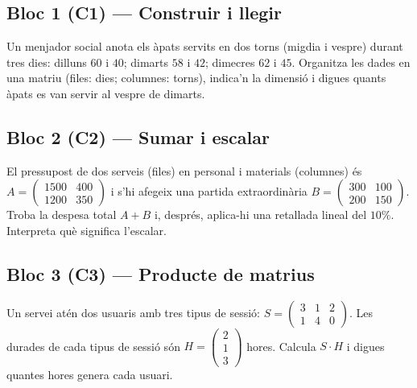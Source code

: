 \subsection{Bloc 1 (C1) — Construir i llegir}

\begin{exercicis}[Bloc 1]
\begin{exlist}
  \item Un menjador social anota els àpats servits en dos torns (migdia i vespre)
        durant tres dies: dilluns $60$ i $40$; dimarts $58$ i $42$; dimecres $62$ i
        $45$. Organitza les dades en una matriu (files: dies; columnes: torns),
        indica'n la dimensió i digues quants àpats es van servir al vespre de
        dimarts.
\end{exlist}
\end{exercicis}

\subsection{Bloc 2 (C2) — Sumar i escalar}

\begin{exercicis}[Bloc 2]
\begin{exlist}
  \item El pressupost de dos serveis (files) en personal i materials (columnes) és
        $A=\begin{pmatrix} 1500 & 400 \\ 1200 & 350 \end{pmatrix}$ i s'hi afegeix una
        partida extraordinària $B=\begin{pmatrix} 300 & 100 \\ 200 & 150 \end{pmatrix}$.
        Troba la despesa total $A+B$ i, després, aplica-hi una retallada lineal del
        $10\%$. Interpreta què significa l'escalar.
\end{exlist}
\end{exercicis}

\subsection{Bloc 3 (C3) — Producte de matrius}

\begin{exercicis}[Bloc 3]
\begin{exlist}
  \item Un servei atén dos usuaris amb tres tipus de sessió:
        $S=\begin{pmatrix} 3 & 1 & 2 \\ 1 & 4 & 0 \end{pmatrix}$. Les durades de cada
        tipus de sessió són $H=\begin{pmatrix} 2 \\ 1 \\ 3 \end{pmatrix}$ hores.
        Calcula $S\cdot H$ i digues quantes hores genera cada usuari.
\end{exlist}
\end{exercicis}

